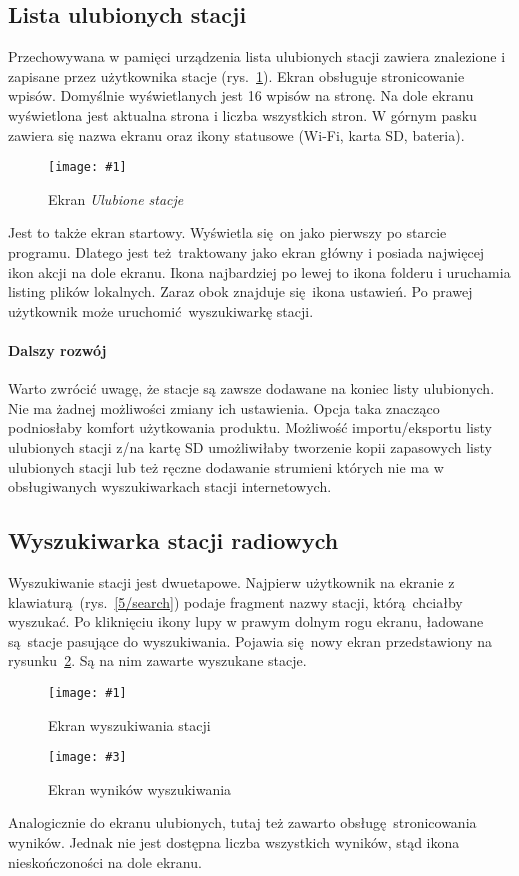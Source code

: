 \documentclass[polish]{aghengthesis}
\newcommand{\imgint}[4]{
	\begin{figure}[{#4}]
		\centering
		\texttt{[image: \#1]}
		\caption{#2}
		\label{#1}
	\end{figure}
}
\newcommand{\imgh}[3]{\imgint{#1}{#2}{#3}{H}}
\newcommand{\imgintss}[5]{
	\begin{figure}[{#5}]
		\centering
		\begin{minipage}{.45\textwidth}
			\centering
			\texttt{[image: \#1]}
			\caption{#2}
			\label{#1}
		\end{minipage}%
		\hfill
		\begin{minipage}{.45\textwidth}
			\centering
			\texttt{[image: \#3]}
			\caption{#4}
			\label{#3}
		\end{minipage}
	\end{figure}
}
\newcommand{\imghss}[4]{\imgintss{#1}{#2}{#3}{#4}{H}}
\begin{document}
		\subsection{Lista ulubionych stacji}
			Przechowywana w pamięci urządzenia lista ulubionych stacji zawiera znalezione i zapisane przez użytkownika stacje (rys.~\ref{5/fav}).
			Ekran obsługuje stronicowanie wpisów. Domyślnie wyświetlanych jest 16 wpisów na stronę. Na dole ekranu wyświetlona jest aktualna strona i liczba wszystkich stron.
			W górnym pasku zawiera się nazwa ekranu oraz ikony statusowe (Wi-Fi, karta SD, bateria).
			
			\imgh{5/fav}{Ekran \textit{Ulubione stacje}}{0.5}
			
			Jest to także ekran startowy. Wyświetla się on jako pierwszy po starcie programu. Dlatego jest też traktowany jako ekran główny i posiada najwięcej ikon akcji na dole ekranu.
			Ikona najbardziej po lewej to ikona folderu i uruchamia listing plików lokalnych. Zaraz obok znajduje się ikona ustawień. Po prawej użytkownik może uruchomić wyszukiwarkę stacji.
			
			\paragraph{Dalszy rozwój}
				Warto zwrócić uwagę, że stacje są zawsze dodawane na koniec listy ulubionych. Nie ma żadnej możliwości zmiany ich ustawienia. Opcja taka znacząco podniosłaby komfort użytkowania produktu. Możliwość importu/eksportu listy ulubionych stacji z/na kartę SD umożliwiłaby tworzenie kopii zapasowych listy ulubionych stacji lub też ręczne dodawanie strumieni których nie ma w obsługiwanych wyszukiwarkach stacji internetowych.
			
		\subsection{Wyszukiwarka stacji radiowych}
			Wyszukiwanie stacji jest dwuetapowe. Najpierw użytkownik na ekranie z klawiaturą (rys.~\ref{5/search}) podaje fragment nazwy stacji, którą chciałby wyszukać. Po kliknięciu ikony lupy w prawym dolnym rogu ekranu, ładowane są stacje pasujące do wyszukiwania. Pojawia się nowy ekran przedstawiony na rysunku~\ref{5/searchres}. Są na nim zawarte wyszukane stacje.
			
			\imghss{5/search}{Ekran wyszukiwania stacji}{5/searchres}{Ekran wyników wyszukiwania}
			
			Analogicznie do ekranu ulubionych, tutaj też zawarto obsługę stronicowania wyników. Jednak nie jest dostępna liczba wszystkich wyników, stąd ikona nieskończoności na dole ekranu.
			
\end{document}
